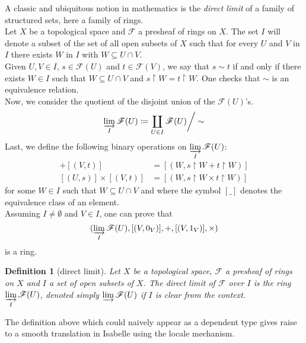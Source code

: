 \documentclass[12pt]{scrartcl}
\newtheorem{definition}[proposition]{Definition}
\begin{document}

A classic and ubiquitous notion in mathematics is the \emph{direct limit} of a family of structured sets, here a family of rings. \\
Let $X$ be a topological space and $\mathscr{F}$ a presheaf of rings on $X$. The set $I$ will denote a subset of the set of all open subsets of $X$ such that for every $U$ and $V$ in $I$ there exists $W$ in $I$ with $W \subseteq U \cap V$. \\
Given $U, V \in I$, $s \in \mathscr{F}(U)$ and $t \in \mathscr{F}(V)$,  we say that 
$s \sim t$ if and only if there exists $W \in I$ such that $W \subseteq U \cap V$ and $s \restriction W = t \restriction W$. One checks that $\sim$ is an equivalence relation. \\
Now, we consider the quotient of the disjoint union of the $\mathscr{F}(U)$'s.
	\[
	\varinjlim_I \mathscr{F}(U) \coloneqq \coprod_{U \in I} \mathscr{F}(U) \bigg/ \sim 
	\]
Last, we define the following binary operations on $\displaystyle \varinjlim_{I} \mathscr{F}(U)$:
	\begin{align*}
	[(U, s)] + [(V, t)] & = [(W, s \restriction W + t \restriction W)] \\
	[(U, s)] \times [(V, t)] & = [(W, s \restriction W \times t \restriction W)]
	\end{align*}
for some $W \in I$ such that $W \subseteq U \cap V$ and where the symbol $[\_]$ denotes the equivalence class of an element. \\
Assuming $I \neq \emptyset$ and $V \in I$, one can prove that  
	\[
	(\varinjlim_I \mathscr{F}(U), [(V, 0_V)], +, [(V, 1_V)], \times)
	\]
is a ring. 

\begin{definition}[direct limit]
	Let $X$ be a topological space, $\mathscr{F}$ a presheaf of rings on $X$ and $I$ a set of open subsets of $X$. The direct limit of $\mathscr{F}$ over $I$ is the ring $\displaystyle \varinjlim_I \mathscr{F}(U)$, denoted simply $\varinjlim \mathscr{F}(U)$ if $I$ is clear from the context.
\end{definition}

The definition above which could naively appear as a dependent type gives raise to a smooth translation in Isabelle using the locale mechanism.

\end{document}
